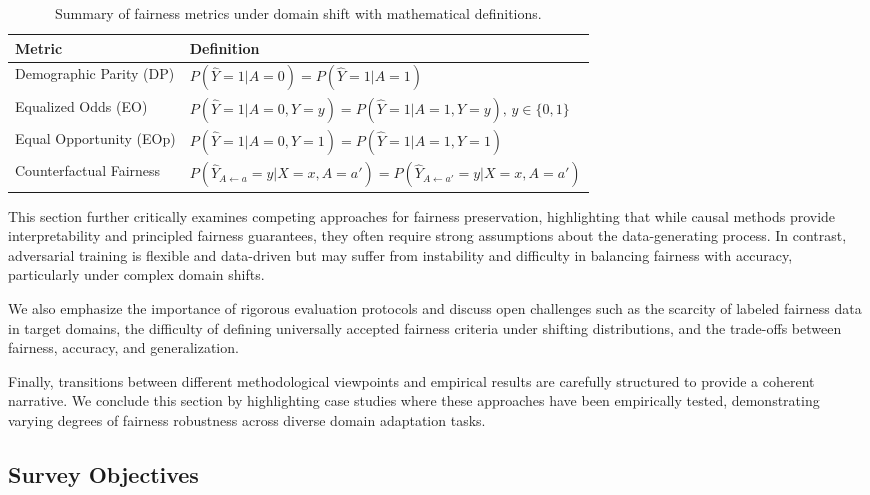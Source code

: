 \documentclass[sigconf]{acmart}
\begin{document}
\begin{table*}[htbp]
\centering
\caption{Summary of fairness metrics under domain shift with mathematical definitions.}
\label{tab:fairness_metrics}
\begin{adjustbox}{max width=\textwidth}
\begin{tabular}{@{}ll@{}}
\toprule
\textbf{Metric} & \textbf{Definition} \\
\midrule
Demographic Parity (DP) & $P(\hat{Y}=1|A=0) = P(\hat{Y}=1|A=1)$ \\
Equalized Odds (EO) & $P(\hat{Y}=1|A=0,Y=y) = P(\hat{Y}=1|A=1,Y=y),\, y \in \{0,1\}$ \\
Equal Opportunity (EOp) & $P(\hat{Y}=1|A=0,Y=1) = P(\hat{Y}=1|A=1,Y=1)$ \\
Counterfactual Fairness & $P(\hat{Y}_{A \leftarrow a} = y | X=x, A=a') = P(\hat{Y}_{A \leftarrow a'} = y | X=x, A=a')$ \\
\bottomrule
\end{tabular}
\end{adjustbox}
\end{table*}

This section further critically examines competing approaches for fairness preservation, highlighting that while causal methods provide interpretability and principled fairness guarantees, they often require strong assumptions about the data-generating process. In contrast, adversarial training is flexible and data-driven but may suffer from instability and difficulty in balancing fairness with accuracy, particularly under complex domain shifts.

We also emphasize the importance of rigorous evaluation protocols and discuss open challenges such as the scarcity of labeled fairness data in target domains, the difficulty of defining universally accepted fairness criteria under shifting distributions, and the trade-offs between fairness, accuracy, and generalization.

Finally, transitions between different methodological viewpoints and empirical results are carefully structured to provide a coherent narrative. We conclude this section by highlighting case studies where these approaches have been empirically tested, demonstrating varying degrees of fairness robustness across diverse domain adaptation tasks.

\subsection{Survey Objectives}
\end{document}
